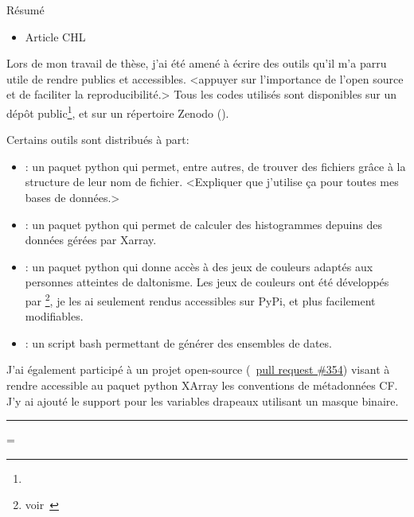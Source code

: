 
Résumé


\clearpage
{}
\label{sec:productions}

\begin{itemize}
        \item Article CHL
\end{itemize}
\medskip

Lors de mon travail de thèse, j'ai été amené à écrire des outils qu'il m'a parru utile de rendre publics et accessibles.
<appuyer sur l'importance de l'open source et de faciliter la reproducibilité.>
Tous les codes utilisés sont disponibles sur un dépôt public\footnote{%
}, et sur un répertoire Zenodo ().
\medskip

Certains outils sont distribués à part:
\begin{itemize}
  \item {}:
        un paquet python qui permet, entre autres, de trouver des fichiers grâce à la structure de leur nom de fichier.
        <Expliquer que j'utilise ça pour toutes mes bases de données.>
  \item {}:
        un paquet python qui permet de calculer des histogrammes depuins des données gérées par Xarray.
  \item {}:
        un paquet python qui donne accès à des jeux de couleurs adaptés aux personnes atteintes de daltonisme. Les jeux de couleurs ont été développés par \footnote{voir~}, je les ai seulement rendus accessibles sur PyPi, et plus facilement modifiables.
  \item {}:
        un script bash permettant de générer des ensembles de dates.
\end{itemize}
\medskip

J'ai également participé à un projet open-source (~\href{https://github.com/xarray-contrib/cf-xarray/pull/354}{pull request \#354}) visant à rendre accessible au paquet python XArray les conventions de métadonnées CF.\@
J'y ai ajouté le support pour les variables drapeaux utilisant un masque binaire.

\begin{center}
  \vspace{1\baselineskip}
  \rule{0.77\textwidth}{0.5pt}
  \vspace{1\baselineskip}
\end{center}

{%
  \raggedright%
  \emergencystretch=\textwidth
  \printbibliography[heading=none, type=software, keyword=personnal]
}
